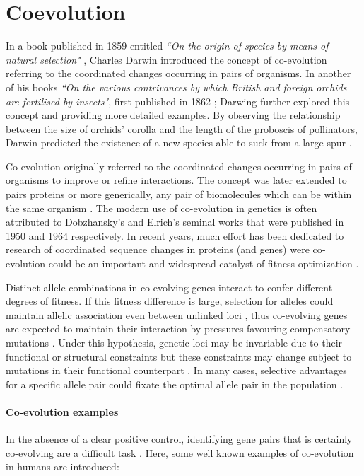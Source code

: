 \section{Coevolution}

In a book published in 1859 entitled \textit{``On the origin of species by means of natural selection"} \cite{darwin1859origin}, Charles Darwin introduced the concept of co-evolution referring to the coordinated changes occurring in pairs of organisms.
In another of his books \textit{``On the various contrivances by which British and foreign orchids are fertilised by insects"}, first published in 1862  \cite{darwin1877various}; Darwing further explored this concept and providing more detailed examples.
By observing the relationship between the size of orchids' corolla and the length of the proboscis of pollinators, Darwin predicted the existence of a new species able to suck from a large spur \cite{de2013emerging}.

Co‐evolution originally referred to the coordinated changes occurring in pairs of organisms to improve or refine interactions.
The concept was later extended to pairs proteins or more generically, any pair of biomolecules which can be within the same organism \cite{de2013emerging}.
The modern use of co-evolution in genetics is often attributed to Dobzhansky's \cite{dobzhansky1950genetics} and Elrich's \cite{ehrlich1964butterflies} seminal works that were published in 1950 and 1964 respectively.
In recent years, much effort has been dedicated to research of coordinated sequence changes in proteins (and genes) were co‐evolution could be an important and widespread catalyst of fitness optimization \cite{de2013emerging}.

Distinct allele combinations in co-evolving genes interact to confer different degrees of fitness. 
If this fitness difference is large, selection for alleles could maintain allelic association even between unlinked loci \cite{rohlfs2010detecting}, thus co-evolving genes are expected to maintain their interaction by pressures favouring compensatory mutations \cite{rohlfs2010detecting}.
Under this hypothesis, genetic loci may be invariable due to their functional or structural constraints but these constraints may change subject to mutations in their functional counterpart \cite{fares2006novel}.
In many cases, selective advantages for a specific allele pair could fixate the optimal allele pair in the population \cite{rohlfs2010detecting}.

\paragraph{Co-evolution examples}
In the absence of a clear positive control, identifying gene pairs that is certainly co-evolving are a difficult task \cite{rohlfs2010detecting}.
Here, some well known examples of co-evolution in humans are introduced:

